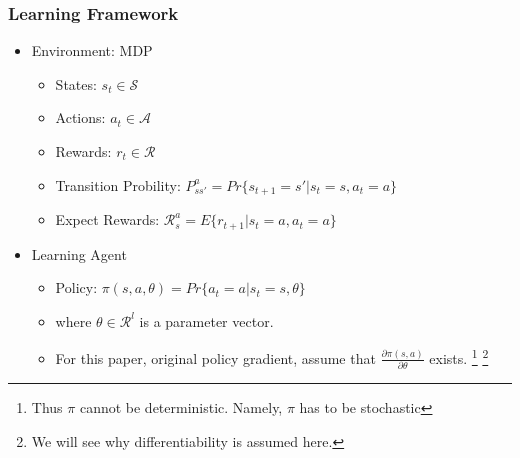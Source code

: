 \begin{frame}
  \frametitle{Learning Framework}
  \begin{itemize}
  \item Environment: MDP
    \begin{itemize}
    \item States: $s_t \in \mathcal{S}$
    \item Actions: $a_t \in \mathcal{A}$
    \item Rewards: $r_t \in \mathcal{R}$
    \item Transition Probility: $P_{ss'}^a = Pr\{s_{t+1} = s' | s_t = s, a_t = a\}$
    \item Expect Rewards: $\mathcal{R}^a_s = E\{r_{t+1} | s_t = a, a_t = a\}$
    \end{itemize}
  \item Learning Agent
    \begin{itemize}
    \item Policy: $\pi(s, a, \theta) = Pr\{a_t = a | s_t = s, \theta\}$
    \item where $\theta \in \mathcal{R}^l$ is a parameter vector.
    \item For this paper, original policy gradient, assume that $\frac{\partial \pi(s, a)}{\partial \theta}$ exists.
      \footnote{Thus $\pi$ cannot be deterministic. Namely, $\pi$ has to be stochastic}
      \footnote{We will see why differentiability is assumed here.}
    \end{itemize}
  \end{itemize}
\end{frame}